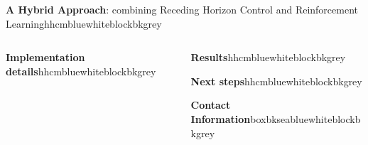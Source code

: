 \documentclass{beamer}
\begin{document}
	
	\begin{frame}[t]
		
			
		\begin{columns}[b]
			
			\begin{column}{0.955\textwidth}
				
				\begin{customblock}{\textbf{A Hybrid Approach}: combining Receding Horizon Control and Reinforcement Learning}{hhcmblue}{white}{blockbkgrey}
					
					
					
				\end{customblock}
		
			\end{column}
		
		\end{columns}
			
		\begin{columns}[T] 

			\begin{column}{.46\textwidth}
				
				\begin{customblock}{\textbf{Implementation details}}{hhcmblue}{white}{blockbkgrey}
					
				\end{customblock}
				
			\end{column}
			
			\begin{column}{.46\textwidth}
			
				\begin{customblock}{\textbf{Results}}{hhcmblue}{white}{blockbkgrey}
					
				\end{customblock}
			
				
				\begin{customblock}{\textbf{Next steps}}{hhcmblue}{white}{blockbkgrey}
					
				\end{customblock}
			
%					
%			
				\begin{customblock}{\textbf{Contact Information}}{boxbkseablue}{white}{blockbkgrey}
					
				\end{customblock}
				

\end{column}
\end{columns}
\end{frame}
\end{document}
